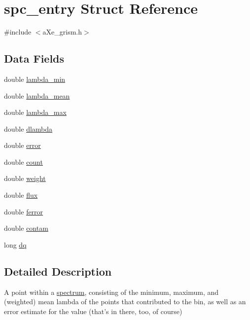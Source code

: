 \hypertarget{structspc__entry}{
\section{spc\_\-entry Struct Reference}
\label{structspc__entry}
}


{\ttfamily \#include $<$aXe\_\-grism.h$>$}\subsection*{Data Fields}
\begin{DoxyCompactItemize}
\item 
double \hyperlink{structspc__entry_a834d349c0cc41820b2435c394a23b9b5}{lambda\_\-min}
\item 
double \hyperlink{structspc__entry_afabeeb9b94d4d47d65ade75c6ff82adc}{lambda\_\-mean}
\item 
double \hyperlink{structspc__entry_ad03114ac70ff73ea0fb8d5d1d36e991e}{lambda\_\-max}
\item 
double \hyperlink{structspc__entry_a97f46ece62a58b05548668058ec97fb7}{dlambda}
\item 
double \hyperlink{structspc__entry_aa00854ac87415f7a7ce9f06018cecfe7}{error}
\item 
double \hyperlink{structspc__entry_a80b739cd679fdd22fc316f86a210614b}{count}
\item 
double \hyperlink{structspc__entry_abb44f7d3d364666f7e64850cc1d05375}{weight}
\item 
double \hyperlink{structspc__entry_ab9baf671046970b64bc5e209815ef3ba}{flux}
\item 
double \hyperlink{structspc__entry_a68d27286e09aa4efa3acc087b171c125}{ferror}
\item 
double \hyperlink{structspc__entry_a8f512d7d02cbdceb5ef45430bec817ca}{contam}
\item 
long \hyperlink{structspc__entry_a031bf569d78d78e605e1f84ac1e64cb9}{dq}
\end{DoxyCompactItemize}


\subsection{Detailed Description}
A point within a \hyperlink{structspectrum}{spectrum}, consisting of the minimum, maximum, and (weighted) mean lambda of the points that contributed to the bin, as well as an error estimate for the value (that's in there, too, of course) 

